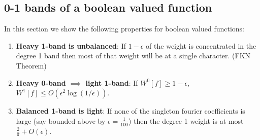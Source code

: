 \documentclass{sig-alternate}
\begin{document}
\subsection{0-1 bands of a boolean valued function}
In this section we show the following properties for boolean valued functions:
\begin{enumerate}
\item {\bf Heavy 1-band is unbalanced}:  If $1-\epsilon$ of the weight is concentrated in the degree 1 band then most of that weight will be at a single character. (FKN Theorem)
\item {\bf Heavy 0-band $\implies$ light 1-band}: If $W^0[f] \geq 1 - \epsilon$, $W^1[f] \leq O(\epsilon^2\log(1/\epsilon))$.
\item {\bf Balanced 1-band is light}: If none of the singleton fourier coefficients is large (say bounded above by $\epsilon = \frac{1}{100}$) then the degree 1 weight is at most $\frac{2}{\pi} + O(\epsilon)$.
\end{enumerate}
\end{document}
